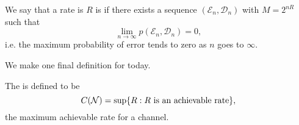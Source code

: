 \begin{defn}
    We say that a rate is $R$ is  if there exists a sequence $(\mathcal{E}_n, \mathcal{D}_n)$ with $M=2^{nR}$ such that
    \begin{equation}
        \lim_{n\to \infty} p(\mathcal{E}_n,\mathcal{D}_n)= 0,
    \end{equation}
    i.e. the maximum probability of error tends to zero as $n$ goes to $\infty$.
\end{defn}

We make one final definition for today.
\begin{defn}
    The  is defined to be
    \begin{equation}
        C(\mathcal{N})=\sup \{R: R\text{ is an achievable rate}\},
    \end{equation}
    the maximum achievable rate for a channel.
\end{defn}